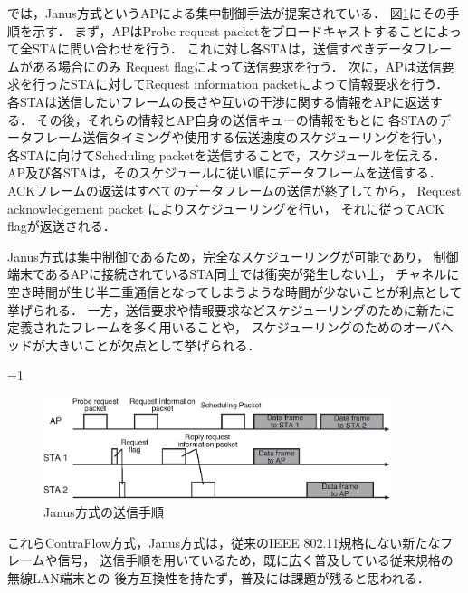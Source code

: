 \documentclass[master]{kuisthesis}		%
\newcounter{flagFig}
\begin{document}
			\par
			\cite{janus}では，Janus方式というAPによる集中制御手法が提案されている．
			図\ref{fig:janus}にその手順を示す．
			まず，APはProbe request packetをブロードキャストすることによって全STAに問い合わせを行う．
			これに対し各STAは，送信すべきデータフレームがある場合にのみ
			Request flagによって送信要求を行う．
			次に，APは送信要求を行ったSTAに対してRequest information packetによって情報要求を行う．
			各STAは送信したいフレームの長さや互いの干渉に関する情報をAPに返送する．
			その後，それらの情報とAP自身の送信キューの情報をもとに
			各STAのデータフレーム送信タイミングや使用する伝送速度のスケジューリングを行い，
			各STAに向けてScheduling packetを送信することで，スケジュールを伝える．
			AP及び各STAは，そのスケジュールに従い順にデータフレームを送信する．
			ACKフレームの返送はすべてのデータフレームの送信が終了してから，
			Request acknowledgement packet によりスケジューリングを行い，
			それに従ってACK flagが返送される．
			\par
			Janus方式は集中制御であるため，完全なスケジューリングが可能であり，
			制御端末であるAPに接続されているSTA同士では衝突が発生しない上，
			チャネルに空き時間が生じ半二重通信となってしまうような時間が少ないことが利点として挙げられる．
			一方，送信要求や情報要求などスケジューリングのために新たに定義されたフレームを多く用いることや，
			スケジューリングのためのオーバヘッドが大きいことが欠点として挙げられる．

			\ifnum\value{flagFig}=1 {\begin{figure}[htbp]
				\begin{center}
					\includegraphics[width=0.9\textwidth]{fig/janus.eps}
					\caption{Janus方式の送信手順}
					\label{fig:janus}
				\end{center}
			\end{figure}}\fi

			\par
			これらContraFlow方式，Janus方式は，従来のIEEE 802.11規格にない新たなフレームや信号，
			送信手順を用いているため，既に広く普及している従来規格の無線LAN端末との
			後方互換性を持たず，普及には課題が残ると思われる．
\end{document}
